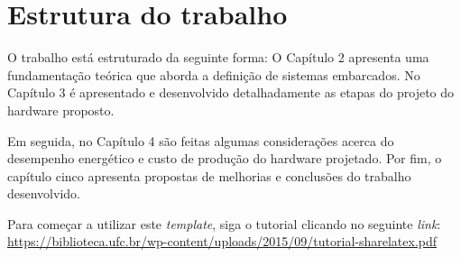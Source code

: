 \section{Estrutura do trabalho}

O trabalho está estruturado da seguinte forma: O Capítulo 2 apresenta uma fundamentação teórica que aborda a definição de sistemas embarcados. No Capítulo 3 é apresentado e desenvolvido detalhadamente as etapas do projeto do hardware proposto.

Em seguida, no Capítulo 4 são feitas algumas considerações acerca do desempenho energético e custo de produção do hardware projetado. Por fim, o capítulo cinco apresenta propostas de melhorias e conclusões do trabalho desenvolvido.
























Para começar a utilizar este \textit{template}, siga o tutorial clicando no seguinte \textit{link}:
\url{https://biblioteca.ufc.br/wp-content/uploads/2015/09/tutorial-sharelatex.pdf}

